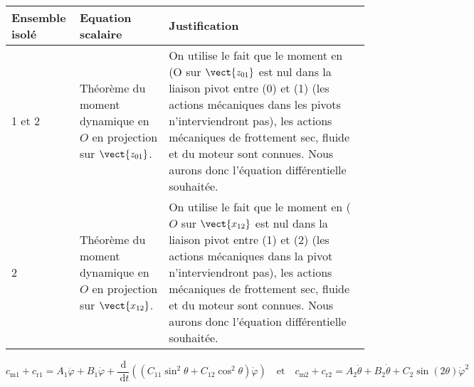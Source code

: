 \ifprof
\begin{corrige} ~\\
\begin{center}
\begin{tabular}{lp{5cm}p{7cm}}
\hline
\textbf{Ensemble isolé} & \textbf{Equation scalaire} & \textbf{Justification} \\
\hline
 1 et 2 & 
Théorème du moment dynamique en $O$ en projection sur $\vect{z_{01}}$. 
& On utilise le fait que le moment en (O sur $\vect{z_{01}}$ est nul dans la liaison pivot entre (0) et (1) (les actions mécaniques dans les pivots n’interviendront pas), les actions mécaniques de frottement sec, fluide et du moteur sont connues. Nous aurons donc l’équation différentielle souhaitée. \\
 2 &	
Théorème du moment dynamique en $O$ en projection sur $\vect{x_{12}}$. 
&On utilise le fait que le moment en ($O$ sur $\vect{x_{12}}$ est nul dans la liaison pivot entre (1) et (2) (les actions mécaniques dans la pivot n’interviendront pas), les actions mécaniques de frottement sec, fluide et du moteur sont connues. Nous aurons donc l’équation différentielle souhaitée. \\
\hline
\end{tabular}
\end{center}
\end{corrige}
\else
\fi



\vspace{-.5cm}
$$ c_{\mathrm{m} 1}+c_{\mathrm{r} 1}=A_{1} \ddot{\varphi}+B_{1} \dot{\varphi}+\frac{\mathrm{d}}{\mathrm{~d} t}\left(\left(C_{11} \sin ^{2} \theta+C_{12} \cos ^{2} \theta\right) \dot{\varphi}\right) 
\quad \text{et} \quad
c_{\mathrm{m} 2}+c_{\mathrm{r} 2}=A_{2} \ddot{\theta}+B_{2} \dot{\theta}+C_{2} \sin (2 \theta) \dot{\varphi}^{2}$$


